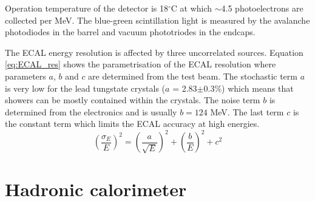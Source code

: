 \par Operation temperature of the detector is 18$^\circ$C at which $\sim$4.5 photoelectrons are collected per MeV. The blue-green scintillation light is measured by the avalanche photodiodes in the barrel and vacuum phototriodes in the endcaps.   
\par The ECAL energy resolution is affected by three uncorrelated sources. Equation \ref{eq:ECAL_res} shows the parametrisation of the ECAL resolution where parameters $a$, $b$ and $c$ are determined from the test beam. The stochastic term $a$ is very low for the lead tungstate crystals ($a$ = 2.83$\pm$0.3$\%$) which means that showers can be mostly contained within the crystals. The noise term $b$ is determined from the electronics and is usually $b=124$ MeV. The last term $c$ is the constant term which limits the ECAL accuracy at high energies.   
\begin{equation}
\left(\frac{\sigma_E}{E}\right)^2 = \left(\frac{a}{\sqrt{E}}\right)^2 + \left(\frac{b}{E}\right)^2 + c^2
\label{eq:ECAL_res}
\end{equation}   


\section{Hadronic calorimeter}


